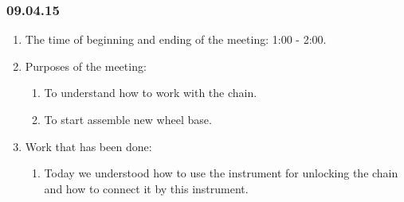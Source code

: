 \subsubsection{09.04.15}
\begin{enumerate}
	
	\item The time of beginning and ending of the meeting: 1:00 - 2:00.
	
	\item Purposes of the meeting: 
	\begin{enumerate}
		
		\item To understand how to work with the chain.
		
		\item To start assemble new wheel base.
		
	\end{enumerate}
	
	\item Work that has been done:
	\begin{enumerate}
		
		\item Today we understood how to use the instrument for unlocking the chain and how to connect it by this instrument.
		

\end{enumerate}
\end{enumerate}
